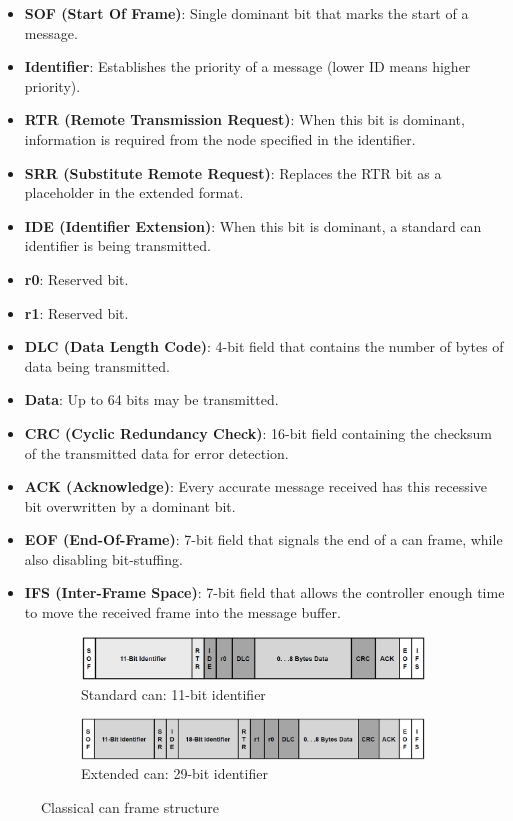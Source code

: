 \begin{itemize}
    \item \textbf{SOF (Start Of Frame)}: Single dominant bit that marks the start of a message.
    \item \textbf{Identifier}: Establishes the priority of a message (lower ID means higher priority).
    \item \textbf{RTR (Remote Transmission Request)}: When this bit is dominant, information is required from the node specified in the identifier.
    \item \textbf{SRR (Substitute Remote Request)}: Replaces the RTR bit as a placeholder in the extended format.
    \item \textbf{IDE (Identifier Extension)}: When this bit is dominant, a standard \gls{can} identifier is being transmitted.
    \item \textbf{r0}: Reserved bit.
    \item \textbf{r1}: Reserved bit.
    \item \textbf{DLC (Data Length Code)}: 4-bit field that contains the number of bytes of data being transmitted.
    \item \textbf{Data}: Up to 64 bits may be transmitted.
    \item \textbf{CRC (Cyclic Redundancy Check)}: 16-bit field containing the checksum of the transmitted data for error detection.
    \item \textbf{ACK (Acknowledge)}: Every accurate message received has this recessive bit overwritten by a dominant bit.
    \item \textbf{EOF (End-Of-Frame)}: 7-bit field that signals the end of a \gls{can} frame, while also disabling bit-stuffing.
    \item \textbf{IFS (Inter-Frame Space)}: 7-bit field that allows the controller enough time to move the received frame into the message buffer.
\end{itemize}

\begin{figure}
    \centering
    \begin{subfigure}{\textwidth}
        \centering
        \includegraphics[width=\textwidth]{img/parts/introduction/Standard CAN.png}
        \caption{Standard \gls{can}: 11-bit identifier}
        \label{fig:standard_can}
    \end{subfigure}
    \begin{subfigure}{\textwidth}
        \centering
        \includegraphics[width=\textwidth]{img/parts/introduction/Extended CAN.png}
        \caption{Extended \gls{can}: 29-bit identifier}
        \label{fig:extended_can}
    \end{subfigure}
    \caption{Classical \gls{can} frame structure \citep{Corrigan2002}}
\end{figure}

